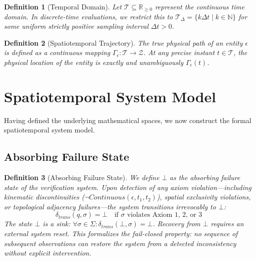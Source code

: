 \documentclass[conference]{IEEEtran}
\newtheorem{definition}{Definition}
\newcommand{\Z}{\mathcal{Z}} %
\newcommand{\T}{\mathcal{T}} %
\newcommand{\fail}{\bot} %
\newcommand{\Tr}{\Gamma} %
\begin{document}
\begin{definition}[Temporal Domain]
Let $\T \subseteq \mathbb{R}_{\ge 0}$ represent the continuous time domain. In discrete-time evaluations, we restrict this to $\T_{\Delta} = \{ k\Delta t \mid k \in \mathbb{N} \}$ for some uniform strictly positive sampling interval $\Delta t > 0$.
\end{definition}

\begin{definition}[Spatiotemporal Trajectory]
The true physical path of an entity $\epsilon$ is defined as a continuous mapping $\Tr_\epsilon: \T \to \Z$. At any precise instant $t \in \T$, the physical location of the entity is exactly and unambiguously $\Tr_\epsilon(t)$.
\end{definition}

\section{Spatiotemporal System Model}

Having defined the underlying mathematical spaces, we now construct the formal spatiotemporal system model.

\subsection{Absorbing Failure State}

\begin{definition}[Absorbing Failure State]
We define $\fail$ as the absorbing failure state of the verification system. Upon detection of any axiom violation---including kinematic discontinuities ($\neg Continuous(\epsilon, t_1, t_2)$), spatial exclusivity violations, or topological adjacency failures---the system transitions irrevocably to $\fail$:
\begin{equation}
\delta_{trans}(q, \sigma) = \fail \quad \text{if } \sigma \text{ violates Axiom 1, 2, or 3}
\end{equation}
The state $\fail$ is a sink: $\forall \sigma \in \Sigma: \delta_{trans}(\fail, \sigma) = \fail$. Recovery from $\fail$ requires an external system reset. This formalizes the fail-closed property: no sequence of subsequent observations can restore the system from a detected inconsistency without explicit intervention.
\end{definition}
\end{document}
